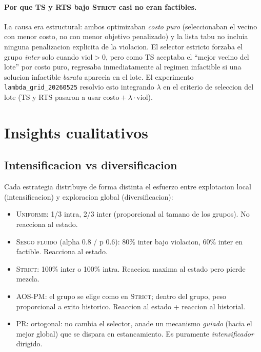 \documentclass[11pt,a4paper]{article}
\newcommand{\meta}[1]{\textsc{#1}}
\begin{document}
\paragraph{Por que TS y RTS bajo \meta{Strict} casi no eran factibles.}
La causa era estructural: ambos optimizaban \emph{costo puro}
(seleccionaban el vecino con menor costo, no con menor objetivo
penalizado) y la lista tabu no incluia ninguna penalizacion explicita
de la violacion. El selector estricto forzaba el grupo \emph{inter}
solo cuando $\text{viol}>0$, pero como TS aceptaba el ``mejor vecino
del lote'' por costo puro, regresaba inmediatamente al regimen
infactible si una solucion infactible \emph{barata} aparecia en el
lote. El experimento \texttt{lambda\_grid\_20260525} resolvio
esto integrando $\lambda$ en el criterio de seleccion del lote (TS y
RTS pasaron a usar $\text{costo} + \lambda\cdot\text{viol}$).

\section{Insights cualitativos}\label{sec:insights}

\subsection{Intensificacion vs diversificacion}

Cada estrategia distribuye de forma distinta el esfuerzo entre
explotacion local (intensificacion) y exploracion global
(diversificacion):
\begin{itemize}
\item \meta{Uniforme}: 1/3 intra, 2/3 inter (proporcional al tamano
de los grupos). No reacciona al estado.
\item \meta{Sesgo fluido} (alpha 0.8 / p 0.6): 80\% inter bajo
violacion, 60\% inter en factible. Reacciona al estado.
\item \meta{Strict}: 100\% inter o 100\% intra. Reaccion maxima al
estado pero pierde mezcla.
\item \meta{AOS-PM}: el grupo se elige como en \meta{Strict}; dentro
del grupo, peso proporcional a exito historico. Reaccion al estado +
reaccion al historial.
\item \meta{PR}: ortogonal: no cambia el selector, anade un mecanismo
\emph{guiado} (hacia el mejor global) que se dispara en estancamiento.
Es puramente \emph{intensificador} dirigido.
\end{itemize}
\end{document}
